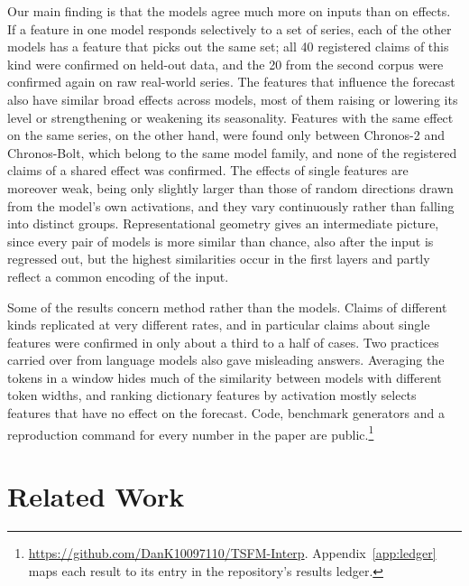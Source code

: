 \documentclass[twoside,11pt]{article}
\newcommand{\repourl}{https://github.com/DanK10097110/TSFM-Interp}
\begin{document}
Our main finding is that the models agree much more on inputs than on effects.
If a feature in one model responds selectively to a set of series, each of the other models has a feature that picks out the same set; all 40 registered claims of this kind were confirmed on held-out data, and the 20 from the second corpus were confirmed again on raw real-world series.
The features that influence the forecast also have similar broad effects across models, most of them raising or lowering its level or strengthening or weakening its seasonality.
Features with the same effect on the same series, on the other hand, were found only between Chronos-2 and Chronos-Bolt, which belong to the same model family, and none of the registered claims of a shared effect was confirmed.
The effects of single features are moreover weak, being only slightly larger than those of random directions drawn from the model's own activations, and they vary continuously rather than falling into distinct groups.
Representational geometry gives an intermediate picture, since every pair of models is more similar than chance, also after the input is regressed out, but the highest similarities occur in the first layers and partly reflect a common encoding of the input.

Some of the results concern method rather than the models.
Claims of different kinds replicated at very different rates, and in particular claims about single features were confirmed in only about a third to a half of cases.
Two practices carried over from language models also gave misleading answers.
Averaging the tokens in a window hides much of the similarity between models with different token widths, and ranking dictionary features by activation mostly selects features that have no effect on the forecast.
Code, benchmark generators and a reproduction command for every number in the paper are public.\footnote{\url{\repourl}. Appendix~\ref{app:ledger} maps each result to its entry in the repository's results ledger.}

\section{Related Work}
\label{sec:related}
\end{document}
